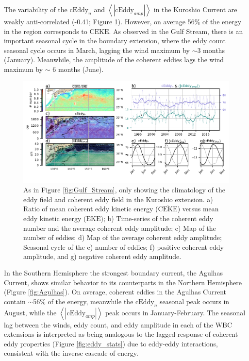 \documentclass[draft,linenumbers]{agujournal2019}
\newcommand{\MEKE}{\overline{\textrm{EKE}}}
\newcommand{\MCEKE}{\overline{\textrm{CEKE}}}
\newcommand{\CEKE}{\textrm{CEKE}}
\newcommand{\cEddy}{\textrm{cEddy}}
\begin{document}
	The variability of the $\cEddy_{n}$ and $\left<|\cEddy_{amp}|\right>$ in the Kuroshio Current are weakly anti-correlated (-0.41; Figure \ref{fig:Kuroshio}). 
	However, on average 56\% of the energy in the region corresponds to $\CEKE$.
	As observed in the Gulf Stream, there is an important seasonal cycle in the boundary extension, where the eddy count seasonal cycle occurs in March, lagging the wind maximum by $\sim$3 months (January). Meanwhile, the amplitude of the coherent eddies lags the wind maximum by $\sim$ 6 months (June). 

	\begin{figure}
	    \centering
	    \includegraphics[width=1\textwidth]{figures/regional_ratios_and_stats_V3_4.pdf}
	    \caption{As in Figure \ref{fig:Gulf_Stream}, only showing the climatology of the eddy field and coherent eddy field in the Kuroshio extension. a) Ratio of mean coherent eddy kinetic energy ($\MCEKE$) versus mean eddy kinetic energy ($\MEKE$); b) Time-series of the coherent eddy number and the average coherent eddy amplitude; c) Map of the number of eddies; d) Map of the average coherent eddy amplitude; Seasonal cycle of the e) number of eddies; f) positive coherent eddy amplitude, and g) negative coherent eddy amplitude.}
	    \label{fig:Kuroshio}
	\end{figure}

	In the Southern Hemisphere the strongest boundary current, the Agulhas Current, shows similar behavior to its counterparts in the Northern Hemisphere (Figure \ref{fig:Agulhas}). On average, coherent eddies in the Agulhas Current contain $\sim$56\% of the energy, meanwhile the $\cEddy_{n}$ seasonal peak occurs in August, while the $\left<|\cEddy_{amp}|\right>$ peak occurs in January-February. 
	The seasonal lag between the winds, eddy count, and eddy amplitude in each of the WBC extensions is interpreted as being analogous to the lagged response of coherent eddy properties (Figure \ref{fig:eddy_stats}) due to eddy-eddy interactions, consistent with the inverse cascade of energy.
\end{document}
